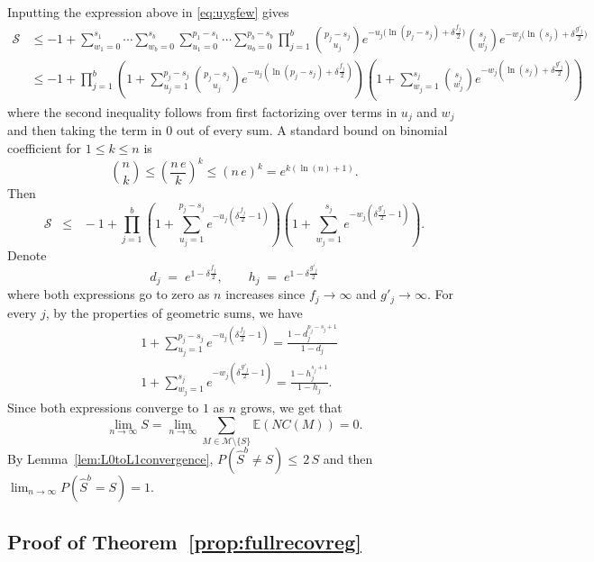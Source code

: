 \documentclass[bj,authoryear]{imsart}
\theoremstyle{plain}
\newcommand{\E}{\mathbb{E}}
\newcommand{\M}{\mathcal{M}}
\begin{document}
Inputting the expression above in \eqref{eq:uygfew} gives
\begin{align*}
    \mathcal{S} 
    &\leq -1+\sum_{w_1=0}^{s_1}\cdots\sum_{w_b=0}^{s_b}\sum_{u_1=0}^{p_1-s_1}\cdots\sum_{u_b=0}^{p_b-s_b}\prod_{j=1}^b {\binom{p_j-s_j}{u_j}}e^{- u_j\big(\ln(p_j-s_j)+\delta \tfrac{f_j}{2}\big)}{\binom{s_j}{w_j}}e^{-w_j\big(\ln(s_j)+\delta \tfrac{g'_j}{2}\big)}\\
    &\leq - 1 + \prod_{j=1}^b\left(1+\sum_{u_j=1}^{p_j-s_j}{\binom{p_j-s_j}{u_j}}e^{- u_j(\ln(p_j-s_j)+\delta \tfrac{f_j}{2})}\right)\left(1+
    \sum_{w_j=1}^{s_j}{\binom{s_j}{w_j}}
    e^{-w_j(\ln(s_j)+\delta \tfrac{g'_j}{2})}\right) 
\end{align*}
where the second inequality follows from first factorizing over terms in $u_j$ and $w_j$ and then taking the term in 0 out of every sum. A standard bound on binomial coefficient for $1\leq k\leq n$ is
\begin{equation}\label{eq:upperboudbinom}
    \binom{n}{k} \leq \left(\frac{n\,e}{k}\right)^k \leq \left(n\,e\right)^k = e^{k(\ln(n)+1)}.
\end{equation}
Then
\begin{equation}\label{eq:upperbound_sumprob}
    \mathcal{S} \;\;\leq\;\; - 1+\prod_{j=1}^b\left(1+\sum_{u_j=1}^{p_j-s_j}e^{-u_j\left(\delta \tfrac{f_j}{2}-1\right)}\right)\left(1+
    \sum_{w_j=1}^{s_j}    e^{-w_j\left(\delta \tfrac{g'_j}{2}-1\right)}\right) .
\end{equation}
Denote
$$
d_j\;=\;e^{1-\delta \tfrac{f_j}{2}},\qquad h_j\;=\;e^{1-\delta \tfrac{g'_j}{2}}
$$
where both expressions go to zero as $n$ increases since $f_j\to\infty$ and $g'_j\to\infty$.
For every $j$, by the properties of geometric sums, we have
\begin{align*}
    &1+\sum_{u_j=1}^{p_j-s_j}e^{-u_j\left(\delta \tfrac{f_j}{2}-1\right)}
    =\frac{1-d_j^{p_j-s_j+1}}{1-d_j} \\
    &1+\sum_{w_j=1}^{s_j}    e^{-w_j\left(\delta \tfrac{g'_j}{2}-1\right)} =\frac{1-h_j^{s_j+1}}{1-h_j}.
\end{align*}
Since both expressions converge to $1$ as $n$ grows, we get that $$\lim_{n \to \infty} S=\lim_{n \to \infty} \sum_{M \in \M\setminus \{S\}}\E\left(NC(M)\right)= 0.$$ By Lemma~\ref{lem:L0toL1convergence}, $P(\hat S^b\neq S)\leq \,2\, S$ and then $\lim_{n \to \infty} P(\hat S^b= S)=1$.

 \subsection{Proof of Theorem~\ref{prop:fullrecovreg}}
\end{document}
